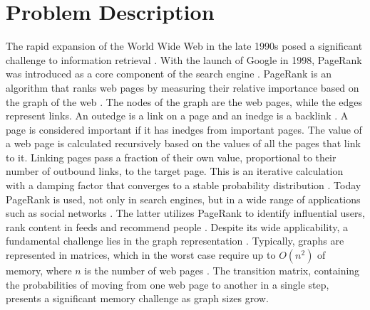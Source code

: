 \documentclass[a4paper,12pt]{article}
\begin{document}
\section{Problem Description}
The rapid expansion of the World Wide Web in the late 1990s posed a significant challenge to information retrieval \cite{page_pagerank_1999}. With the launch of Google in 1998, PageRank was introduced as a core component of the search engine \cite{page_pagerank_1999}. PageRank is an algorithm that ranks web pages by measuring their relative importance based on the graph of the web \cite{page_pagerank_1999}. The nodes of the graph are the web pages, while the edges represent links. An outedge is a link on a page and an inedge is a backlink \cite{page_pagerank_1999}. A page is considered important if it has inedges from important pages. The value of a web page is calculated recursively based on the values of all the pages that link to it. Linking pages pass a fraction of their own value, proportional to their number of outbound links, to the target page. This is an iterative calculation with a damping factor that converges to a stable probability distribution \cite{page_pagerank_1999}.
Today PageRank is used, not only in search engines, but in a wide range of applications such as social networks \cite{wu_efficient_2024}. The latter utilizes PageRank to identify influential users, rank content in feeds and recommend people \cite{weng_twitterrank_2010}. Despite its wide applicability, a fundamental challenge lies in the graph representation \cite{liu_fast_2015}. Typically, graphs are represented in matrices, which in the worst case require up to $O(n^2)$ of memory, where $n$ is the number of web pages \cite{wu_efficient_2024}. The transition matrix, containing the probabilities of moving from one web page to another in a single step, presents a significant memory challenge as graph sizes grow. 
\end{document}
